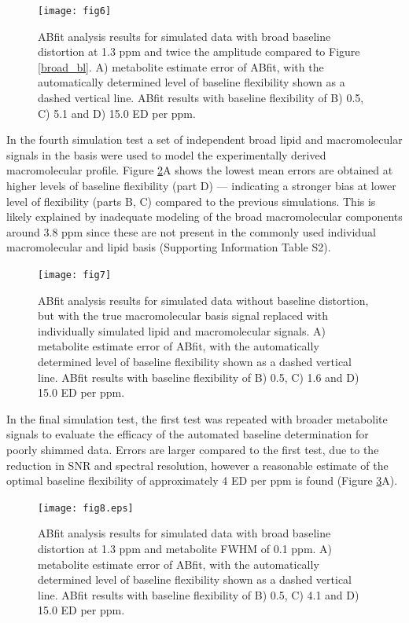 \documentclass[num-refs]{wiley-article}
\begin{document}
\begin{figure}
  \begin{center}
    \texttt{[image: fig6]}
    \caption{ABfit analysis results for simulated data with broad baseline distortion at 1.3 ppm and twice the amplitude compared to Figure \ref{broad_bl}. A) metabolite estimate error of ABfit, with the automatically determined level of baseline flexibility shown as a dashed vertical line. ABfit results with baseline flexibility of B) 0.5, C) 5.1 and D) 15.0 ED per ppm.}
    \label{big_broad_bl}
  \end{center}
\end{figure}

In the fourth simulation test a set of independent broad lipid and macromolecular signals in the basis were used to model the experimentally derived macromolecular profile. Figure \ref{sim_lip_mm_basis}A shows the lowest mean errors are obtained at higher levels of baseline flexibility (part D) --- indicating a stronger bias at lower level of flexibility (parts B, C) compared to the previous simulations. This is likely explained by inadequate modeling of the broad macromolecular components around 3.8 ppm since these are not present in the commonly used individual macromolecular and lipid basis (Supporting Information Table S2).

\begin{figure}
  \begin{center}
    \texttt{[image: fig7]}
    \caption{ABfit analysis results for simulated data without baseline distortion, but with the true macromolecular basis signal replaced with individually simulated lipid and macromolecular signals. A) metabolite estimate error of ABfit, with the automatically determined level of baseline flexibility shown as a dashed vertical line. ABfit results with baseline flexibility of B) 0.5, C) 1.6 and D) 15.0 ED per ppm.}
    \label{sim_lip_mm_basis}
  \end{center}
\end{figure}

In the final simulation test, the first test was repeated with broader metabolite signals to evaluate the efficacy of the automated baseline determination for poorly shimmed data. Errors are larger compared to the first test, due to the reduction in SNR and spectral resolution, however a reasonable estimate of the optimal baseline flexibility of approximately 4 ED per ppm is found (Figure \ref{broad_bl_bad_shim}A).

\begin{figure}
  \begin{center}
    \texttt{[image: fig8.eps]}
    \caption{ABfit analysis results for simulated data with broad baseline distortion at 1.3 ppm and metabolite FWHM of 0.1 ppm. A) metabolite estimate error of ABfit, with the automatically determined level of baseline flexibility shown as a dashed vertical line. ABfit results with baseline flexibility of B) 0.5, C) 4.1 and D) 15.0 ED per ppm.}
    \label{broad_bl_bad_shim}
  \end{center}
\end{figure}
\end{document}
